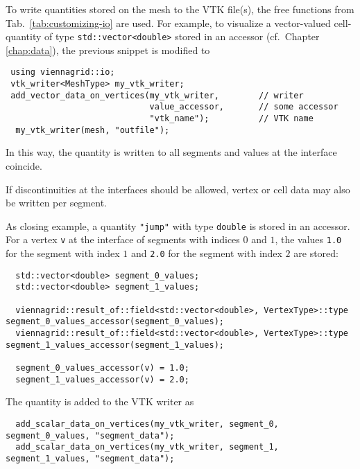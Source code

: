  To write quantities stored on the mesh to the VTK file(s), the free functions from Tab.~\ref{tab:customizing-io} are used.
 For example, to visualize a vector-valued cell-quantity of type \lstinline|std::vector<double>| stored in an accessor (cf.~Chapter \ref{chap:data}), the previous snippet is modified to
 \begin{lstlisting}
 using viennagrid::io;
 vtk_writer<MeshType> my_vtk_writer;
 add_vector_data_on_vertices(my_vtk_writer,        // writer
                             value_accessor,       // some accessor
                             "vtk_name");          // VTK name
  my_vtk_writer(mesh, "outfile");
 \end{lstlisting}
 In this way, the quantity is written to all segments and values at the interface coincide.

 If discontinuities at the interfaces should be allowed, vertex or cell data may also be written per segment.
 
 \pagebreak
 
 As closing example, a quantity \lstinline|"jump"| with type \lstinline|double| is stored in an accessor.
 For a vertex \lstinline|v| at the interface of segments with indices $0$ and $1$, the values \lstinline|1.0| for the segment with index $1$ and \lstinline|2.0| for the segment with index $2$ are stored:
 \begin{lstlisting}
  std::vector<double> segment_0_values;
  std::vector<double> segment_1_values;
  
  viennagrid::result_of::field<std::vector<double>, VertexType>::type segment_0_values_accessor(segment_0_values);
  viennagrid::result_of::field<std::vector<double>, VertexType>::type segment_1_values_accessor(segment_1_values);
 
  segment_0_values_accessor(v) = 1.0;
  segment_1_values_accessor(v) = 2.0;
 \end{lstlisting}
 
 \pagebreak
 
 The quantity is added to the VTK writer as
 \begin{lstlisting}
  add_scalar_data_on_vertices(my_vtk_writer, segment_0, segment_0_values, "segment_data");
  add_scalar_data_on_vertices(my_vtk_writer, segment_1, segment_1_values, "segment_data");
 \end{lstlisting}

